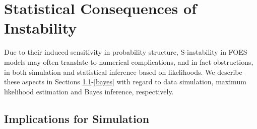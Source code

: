 \documentclass[numbib]{imamat}
\theoremstyle{theorem}
\theoremstyle{lemma}
\theoremstyle{example}
\theoremstyle{corollary}
\theoremstyle{definition}
\theoremstyle{remark}
\theoremstyle{approximation}
\theoremstyle{scheme}
\begin{document}
\hypertarget{implications}{%
\section{Statistical Consequences of Instability}\label{implications}}

Due to their induced sensitivity in probability structure, S-instability
in FOES models may often translate to numerical complications, and in
fact obstructions, in both simulation and statistical inference based on
likelihoods. We describe these aspects in Sections
\ref{mcmc}-\ref{bayes} with regard to data simulation, maximum
likelihood estimation and Bayes inference, respectively.

\hypertarget{mcmc}{%
\subsection{Implications for Simulation}\label{mcmc}}
\end{document}
